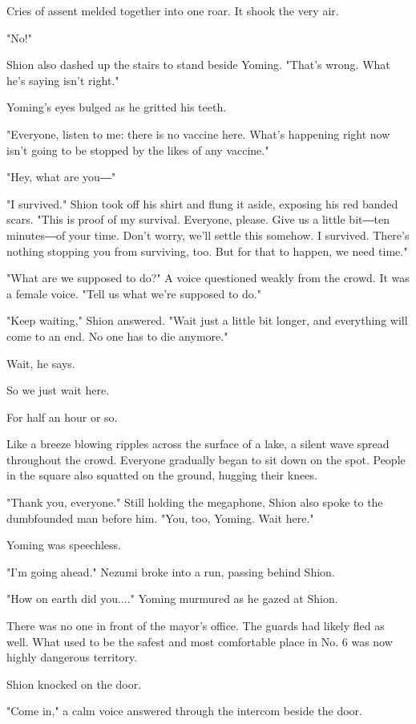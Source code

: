 Cries of assent melded together into one roar. It shook the very air.

"No!"

Shion also dashed up the stairs to stand beside Yoming. "That's wrong.
What he's saying isn't right."

Yoming's eyes bulged as he gritted his teeth.

"Everyone, listen to me: there is no vaccine here. What's happening
right now isn't going to be stopped by the likes of any vaccine."

"Hey, what are you―"

"I survived." Shion took off his shirt and flung it aside, exposing his
red banded scars. "This is proof of my survival. Everyone, please. Give
us a little bit―ten minutes―of your time. Don't worry, we'll settle this
somehow. I survived. There's nothing stopping you from surviving, too.
But for that to happen, we need time."

"What are we supposed to do?" A voice questioned weakly from the crowd.
It was a female voice. "Tell us what we're supposed to do."

"Keep waiting," Shion answered. "Wait just a little bit longer, and
everything will come to an end. No one has to die anymore."

Wait, he says.

So we just wait here.

For half an hour or so.

Like a breeze blowing ripples across the surface of a lake, a silent
wave spread throughout the crowd. Everyone gradually began to sit down
on the spot. People in the square also squatted on the ground, hugging
their knees.

"Thank you, everyone." Still holding the megaphone, Shion also spoke to
the dumbfounded man before him. "You, too, Yoming. Wait here."

Yoming was speechless.

"I'm going ahead." Nezumi broke into a run, passing behind Shion.

"How on earth did you...." Yoming murmured as he gazed at Shion.

There was no one in front of the mayor's office. The guards had likely
fled as well. What used to be the safest and most comfortable place in
No. 6 was now highly dangerous territory.

Shion knocked on the door.

"Come in," a calm voice answered through the intercom beside the door.

